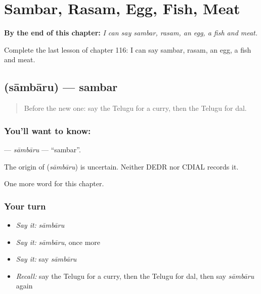 
\chapter{Sambar, Rasam, Egg, Fish, Meat}
\label{ch:te-sambar-rasam-egg-fish-meat}

\begin{chapteropening}
\textbf{By the end of this chapter:} \emph{I can say sambar, rasam, an egg, a fish and meat.}

Complete the last lesson of chapter 116: I can say sambar, rasam, an egg, a fish and meat.
\end{chapteropening}

\section[\texorpdfstring{\te{సాంబారు} (sāmbāru)}{సాంబారు (sāmbāru)}]{ (sāmbāru) — sambar}

\label{lesson:TE-C116-sambaru}



\begin{quote}
Before the new one: say the Telugu for a curry, then the Telugu for dal.
\end{quote}

\subsection*{You'll want to know: }
\textbf{} — \emph{sāmbāru} — \textquotedblleft{}sambar\textquotedblright{}.

\begin{cousinweb}
The origin of \textbf{} (\emph{sāmbāru}) is uncertain. Neither DEDR nor CDIAL records it.
\end{cousinweb}

\begin{grammarlens}[title={What you've built}]
One more word for this chapter.
\end{grammarlens}

\subsection*{Your turn}
\begin{itemize}
\raggedright
  \item \emph{Say it:} \emph{sāmbāru}
  \item \emph{Say it:} \emph{sāmbāru}, once more
  \item \emph{Say it:} say \emph{sāmbāru}
  \item \emph{Recall:} say the Telugu for a curry, then the Telugu for dal, then say \emph{sāmbāru} again
\end{itemize}

